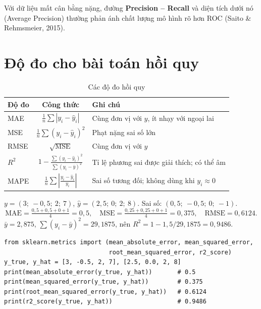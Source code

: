 
Với dữ liệu mất cân bằng nặng, đường \textbf{Precision -- Recall} và diện tích dưới nó (Average Precision) thường phản ánh chất lượng mô hình rõ hơn ROC (Saito \& Rehmsmeier, 2015).

\section{Độ đo cho bài toán hồi quy}

\begin{table}[H]
\centering
\begin{tabular}{|l|c|p{6cm}|}
\hline
\textbf{Độ đo} & \textbf{Công thức} & \textbf{Ghi chú} \\
\hline
MAE & $\frac{1}{n}\sum |y_i - \hat{y}_i|$ & Cùng đơn vị với $y$, ít nhạy với ngoại lai \\[4pt] \hline
MSE & $\frac{1}{n}\sum (y_i - \hat{y}_i)^2$ & Phạt nặng sai số lớn \\[4pt] \hline
RMSE & $\sqrt{\text{MSE}}$ & Cùng đơn vị với $y$ \\[4pt] \hline
$R^2$ & $1 - \frac{\sum (y_i - \hat{y}_i)^2}{\sum (y_i - \bar{y})^2}$ & Tỉ lệ phương sai được giải thích; có thể âm \\[4pt] \hline
MAPE & $\frac{1}{n}\sum \left|\frac{y_i - \hat{y}_i}{y_i}\right|$ & Sai số tương đối; không dùng khi $y_i \approx 0$ \\[4pt] \hline
\end{tabular}
\caption{Các độ đo hồi quy}
\end{table}

\begin{example}
$y = (3;\ -0{,}5;\ 2;\ 7)$, $\hat{y} = (2{,}5;\ 0;\ 2;\ 8)$. Sai số: $(0{,}5;\ -0{,}5;\ 0;\ -1)$.
\[
    \text{MAE} = \tfrac{0{,}5 + 0{,}5 + 0 + 1}{4} = 0{,}5, \quad
    \text{MSE} = \tfrac{0{,}25 + 0{,}25 + 0 + 1}{4} = 0{,}375, \quad
    \text{RMSE} = 0{,}6124 .
\]
$\bar{y} = 2{,}875$, $\sum (y_i - \bar{y})^2 = 29{,}1875$, nên $R^2 = 1 - 1{,}5 / 29{,}1875 = 0{,}9486$.
\end{example}

\begin{lstlisting}[caption={Độ đo hồi quy trong scikit-learn}]
from sklearn.metrics import (mean_absolute_error, mean_squared_error,
                             root_mean_squared_error, r2_score)
y_true, y_hat = [3, -0.5, 2, 7], [2.5, 0.0, 2, 8]
print(mean_absolute_error(y_true, y_hat))       # 0.5
print(mean_squared_error(y_true, y_hat))        # 0.375
print(root_mean_squared_error(y_true, y_hat))   # 0.6124
print(r2_score(y_true, y_hat))                  # 0.9486
\end{lstlisting}

